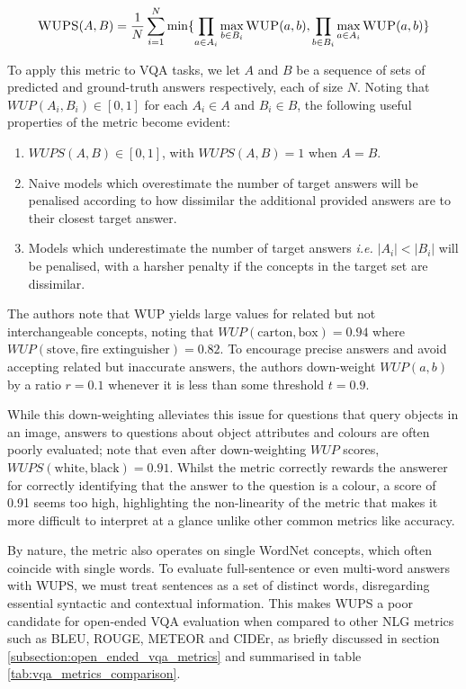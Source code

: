 \begin{equation}
    \textsc{WUPS}(A, B) = \frac{1}{N} \sum_{i=1}^N \min \{\prod_{a \in A_i} \max_{b \in B_i} \textsc{WUP}(a, b), \prod_{b \in B_i} \max_{a \in A_i} \textsc{WUP}(a, b)\}
    \label{eq:wups}
\end{equation}

To apply this metric to VQA tasks, we let \(A\) and \(B\) be a sequence of sets of predicted and ground-truth answers respectively, each of size \(N\). Noting that \(WUP(A_i, B_i) \in [0, 1]\) for each \(A_i \in A\) and \(B_i \in B\), the following useful properties of the metric become evident:

\begin{enumerate}
    \item \(WUPS(A, B) \in [0, 1]\), with \(WUPS(A, B) = 1\) when \(A = B\).
    \item Naive models which overestimate the number of target answers will be penalised according to how dissimilar the additional provided answers are to their closest target answer.
    \item Models which underestimate the number of target answers \textit{i.e.} \(|A_i| < |B_i|\) will be penalised, with a harsher penalty if the concepts in the target set are dissimilar.
\end{enumerate}

The authors note that WUP yields large values for related but not interchangeable concepts, noting that \(WUP(\text{carton}, \text{box}) = 0.94\) where \(WUP(\text{stove}, \text{fire extinguisher}) = 0.82\). To encourage precise answers and avoid accepting related but inaccurate answers, the authors down-weight \(WUP(a, b)\) by a ratio \(r = 0.1\) whenever it is less than some threshold \(t = 0.9\).

While this down-weighting alleviates this issue for questions that query objects in an image, answers to questions about object attributes and colours are often poorly evaluated; \citeauthor{kafle2017visual} note that even after down-weighting \(WUP\) scores, \(WUPS(\text{white}, \text{black}) = 0.91\). Whilst the metric correctly rewards the answerer for correctly identifying that the answer to the question is a colour, a score of 0.91 seems too high, highlighting the non-linearity of the metric that makes it more difficult to interpret at a glance unlike other common metrics like accuracy.

By nature, the metric also operates on single WordNet concepts, which often coincide with single words. To evaluate full-sentence or even multi-word answers with WUPS, we must treat sentences as a set of distinct words, disregarding essential syntactic and contextual information. This makes WUPS a poor candidate for open-ended VQA evaluation when compared to other NLG metrics such as BLEU, ROUGE, METEOR and CIDEr, as briefly discussed in section \ref{subsection:open_ended_vqa_metrics} and summarised in table \ref{tab:vqa_metrics_comparison}.

